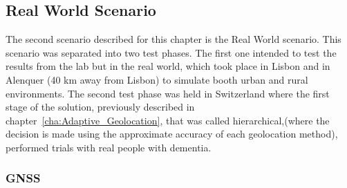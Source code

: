 










\newpage
\subsection{Real World Scenario}
\label{subsec:real_world}
The second scenario described for this chapter is the Real World scenario. This scenario was separated into two test phases. The first one intended to test the results from the lab but in the real world, which took place in Lisbon and in Alenquer (40 km away from Lisbon) to simulate booth urban and rural environments. The second test phase was held in Switzerland where the first stage of the solution, previously described in chapter~\ref{cha:Adaptive_Geolocation}, that was called hierarchical,(where the decision is made using the approximate accuracy of each geolocation method), performed trials with real people with dementia. 

\subsubsection{GNSS}
\label{subsubsec:GNSS}

